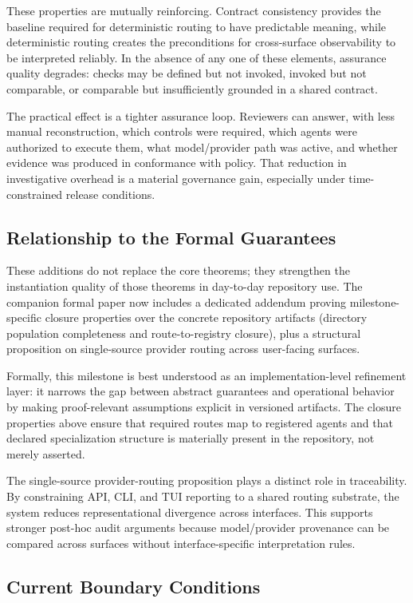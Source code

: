 \documentclass[12pt]{article}
\begin{document}
These properties are mutually reinforcing. Contract consistency provides
the baseline required for deterministic routing to have predictable
meaning, while deterministic routing creates the preconditions for
cross-surface observability to be interpreted reliably. In the absence
of any one of these elements, assurance quality degrades: checks may be
defined but not invoked, invoked but not comparable, or comparable but
insufficiently grounded in a shared contract.

The practical effect is a tighter assurance loop. Reviewers can answer,
with less manual reconstruction, which controls were required, which
agents were authorized to execute them, what model/provider path was
active, and whether evidence was produced in conformance with policy.
That reduction in investigative overhead is a material governance gain,
especially under time-constrained release conditions.

\subsection{Relationship to the Formal Guarantees}

These additions do not replace the core theorems; they strengthen the
instantiation quality of those theorems in day-to-day repository use.
The companion formal paper now includes a dedicated addendum proving
milestone-specific closure properties over the concrete repository
artifacts (directory population completeness and route-to-registry
closure), plus a structural proposition on single-source provider routing
across user-facing surfaces.

Formally, this milestone is best understood as an implementation-level
refinement layer: it narrows the gap between abstract guarantees and
operational behavior by making proof-relevant assumptions explicit in
versioned artifacts. The closure properties above ensure that required
routes map to registered agents and that declared specialization
structure is materially present in the repository, not merely asserted.

The single-source provider-routing proposition plays a distinct role in
traceability. By constraining API, CLI, and TUI reporting to a shared
routing substrate, the system reduces representational divergence across
interfaces. This supports stronger post-hoc audit arguments because
model/provider provenance can be compared across surfaces without
interface-specific interpretation rules.

\subsection{Current Boundary Conditions}
\end{document}

